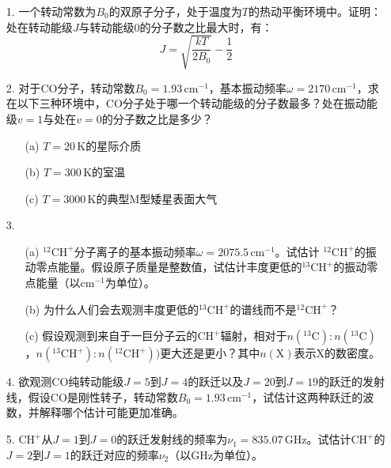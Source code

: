 \documentclass[a4paper]{article}
\begin{document}
\begin{enumerate}
    \item[1.]
    一个转动常数为$B_0$的双原子分子，处于温度为$T$的热动平衡环境中。证明：处在转动能级$J$与转动能级0的分子数之比最大时，有：
    \[
        J = \sqrt{\dfrac{kT}{2B_0}}-\dfrac{1}{2}
    \]

    \bigskip
    \item[2.]
    对于$\mathrm{CO}$分子，转动常数$B_0=1.93\,\mathrm{cm}^{-1}$，基本振动频率$\omega=2170\,\mathrm{cm}^{-1}$，求在以下三种环境中，$\mathrm{CO}$分子处于哪一个转动能级的分子数最多？处在振动能级$v=1$与处在$v=0$的分子数之比是多少？
    \begin{enumerate}
        \item[(a)] $T=20\,\mathrm{K}$的星际介质

        \item[(b)] $T=300\,\mathrm{K}$的室温

        \item[(c)] $T=3000\,\mathrm{K}$的典型M型矮星表面大气
    \end{enumerate}

    \bigskip
    \item[3.]
    \begin{enumerate}
        \item[(a)] $^{12}\mathrm{CH}^+$分子离子的基本振动频率$\omega=2075.5\,\mathrm{cm}^{-1}$。试估计 $^{12}\mathrm{CH}^+$的振动零点能量。假设原子质量是整数值，试估计丰度更低的$^{13}\mathrm{CH}^+$的振动零点能量（以$\mathrm{cm}^{-1}$为单位）。

        \item[(b)] 为什么人们会去观测丰度更低的$^{13}\mathrm{CH}^+$的谱线而不是$^{12}\mathrm{CH}^+$？

        \item[(c)] 假设观测到来自于一巨分子云的$\mathrm{CH}^+$辐射，相对于$n(^{13}\mathrm{C}):n(^{13}\mathrm{C})$，$n(^{13}\mathrm{CH}^+):n(^{12}\mathrm{CH}^+))$更大还是更小？其中$n(\mathrm{X})$表示$\mathrm{X}$的数密度。
    \end{enumerate}

    \bigskip
    \item[4.]
    欲观测CO纯转动能级$J=5$到$J=4$的跃迁以及$J=20$到$J=19$的跃迁的发射线，假设CO是刚性转子，转动常数$B_0=1.93\,\mathrm{cm}^{-1}$，试估计这两种跃迁的波数，并解释哪个估计可能更加准确。

    \bigskip
    \item[5.]
    $\mathrm{CH}^+$从$J=1$到$J=0$的跃迁发射线的频率为$\nu_1=835.07\,\mathrm{GHz}$。试估计$\mathrm{CH}^+$的$J=2$到$J=1$的跃迁对应的频率$\nu_2$（以$\mathrm{GHz}$为单位）。


\end{enumerate}
\end{document}
